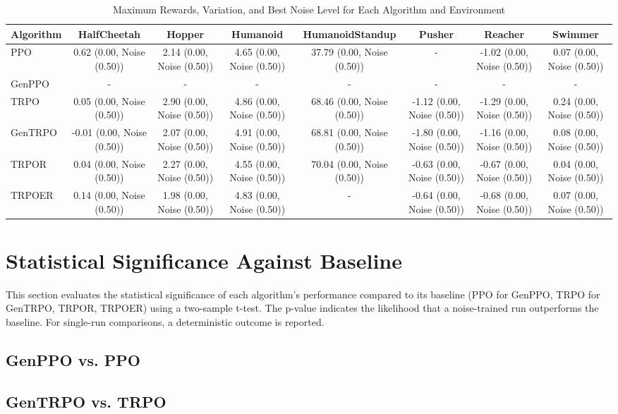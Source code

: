 \begin{table}[h]
\centering
\caption{Maximum Rewards, Variation, and Best Noise Level for Each Algorithm and Environment}
\label{tab:numerical_results}
\begin{tabular}{|l|c|c|c|c|c|c|c|}
\hline
Algorithm & HalfCheetah & Hopper & Humanoid & HumanoidStandup & Pusher & Reacher & Swimmer \\ \hline
PPO & 0.62 (0.00, Noise (0.50)) & 2.14 (0.00, Noise (0.50)) & 4.65 (0.00, Noise (0.50)) & 37.79 (0.00, Noise (0.50)) & - & -1.02 (0.00, Noise (0.50)) & 0.07 (0.00, Noise (0.50)) \\ \hline
GenPPO & - & - & - & - & - & - & - \\ \hline
TRPO & 0.05 (0.00, Noise (0.50)) & 2.90 (0.00, Noise (0.50)) & 4.86 (0.00, Noise (0.50)) & 68.46 (0.00, Noise (0.50)) & -1.12 (0.00, Noise (0.50)) & -1.29 (0.00, Noise (0.50)) & 0.24 (0.00, Noise (0.50)) \\ \hline
GenTRPO & -0.01 (0.00, Noise (0.50)) & 2.07 (0.00, Noise (0.50)) & 4.91 (0.00, Noise (0.50)) & 68.81 (0.00, Noise (0.50)) & -1.80 (0.00, Noise (0.50)) & -1.16 (0.00, Noise (0.50)) & 0.08 (0.00, Noise (0.50)) \\ \hline
TRPOR & 0.04 (0.00, Noise (0.50)) & 2.27 (0.00, Noise (0.50)) & 4.55 (0.00, Noise (0.50)) & 70.04 (0.00, Noise (0.50)) & -0.63 (0.00, Noise (0.50)) & -0.67 (0.00, Noise (0.50)) & 0.04 (0.00, Noise (0.50)) \\ \hline
TRPOER & 0.14 (0.00, Noise (0.50)) & 1.98 (0.00, Noise (0.50)) & 4.83 (0.00, Noise (0.50)) & - & -0.64 (0.00, Noise (0.50)) & -0.68 (0.00, Noise (0.50)) & 0.07 (0.00, Noise (0.50)) \\ \hline
\end{tabular}
\end{table}
\section{Statistical Significance Against Baseline}
This section evaluates the statistical significance of each algorithm’s performance compared to its baseline (PPO for GenPPO, TRPO for GenTRPO, TRPOR, TRPOER) using a two-sample t-test. The p-value indicates the likelihood that a noise-trained run outperforms the baseline. For single-run comparisons, a deterministic outcome is reported.
\subsection{GenPPO vs. PPO}
\subsection{GenTRPO vs. TRPO}

